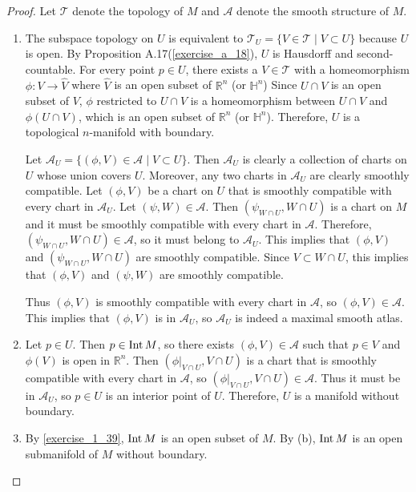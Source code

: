 \begin{proof}
  Let $\mathcal{T}$ denote the topology of $M$ and $\mathcal{A}$ denote the smooth structure of $M$.
  \begin{enumerate}[label=(\alph*)]
    \item
      The subspace topology on $U$ is equivalent to $\mathcal{T}_U = \{ V \in \mathcal{T} \mid V \subset U \}$ because $U$ is open.
      By Proposition A.17(\ref{exercise_a_18}), $U$ is Hausdorff and second-countable.
      For every point $p \in U$, there exists a $V \in \mathcal{T}$ with a homeomorphism $\phi: V \rightarrow \hat{V}$ where $\hat{V}$ is an open subset of $\mathbb{R}^n$ (or $\mathbb{H}^n$)
      Since $U \cap V$ is an open subset of $V$, $\phi$ restricted to $U \cap V$ is a homeomorphism between $U \cap V$ and $\phi(U \cap V)$, which is an open subset of $\mathbb{R}^n$ (or $\mathbb{H}^n$).
      Therefore, $U$ is a topological $n$-manifold with boundary.

      Let $\mathcal{A}_U = \{ (\phi, V) \in \mathcal{A} \mid V \subset U \}$.
      Then $\mathcal{A}_U$ is clearly a collection of charts on $U$ whose union covers $U$.
      Moreover, any two charts in $\mathcal{A}_U$ are clearly smoothly compatible.
      Let $(\phi, V)$ be a chart on $U$ that is smoothly compatible with every chart in $\mathcal{A}_U$.
      Let $(\psi, W) \in \mathcal{A}$.
      Then $(\psi_{W \cap U}, W \cap U)$ is a chart on $M$ and it must be smoothly compatible with every chart in $\mathcal{A}$.
      Therefore, $(\psi_{W \cap U}, W \cap U) \in \mathcal{A}$, so it must belong to $\mathcal{A}_U$.
      This implies that $(\phi, V)$ and $(\psi_{W \cap U}, W \cap U)$ are smoothly compatible.
      Since $V \subset W \cap U$, this implies that $(\phi, V)$ and $(\psi, W)$ are smoothly compatible.

      Thus $(\phi, V)$ is smoothly compatible with every chart in $\mathcal{A}$, so $(\phi, V) \in \mathcal{A}$.
      This implies that $(\phi, V)$ is in $\mathcal{A}_U$, so $\mathcal{A}_U$ is indeed a maximal smooth atlas.
    \item
      Let $p \in U$.
      Then $p \in \operatorname{Int} M$, so there exists $(\phi, V) \in \mathcal{A}$ such that $p \in V$ and $\phi(V)$ is open in $\mathbb{R}^n$.
      Then $(\phi\vert_{V \cap U}, V \cap U)$ is a chart that is smoothly compatible with every chart in $\mathcal{A}$, so $(\phi\vert_{V \cap U}, V \cap U) \in \mathcal{A}$.
      Thus it must be in $\mathcal{A}_U$, so $p \in U$ is an interior point of $U$.
      Therefore, $U$ is a manifold without boundary.
    \item
      By \ref{exercise_1_39}, $\operatorname{Int} M$ is an open subset of $M$.
      By (b), $\operatorname{Int} M$ is an open submanifold of $M$ without boundary.
  \end{enumerate}
\end{proof}

